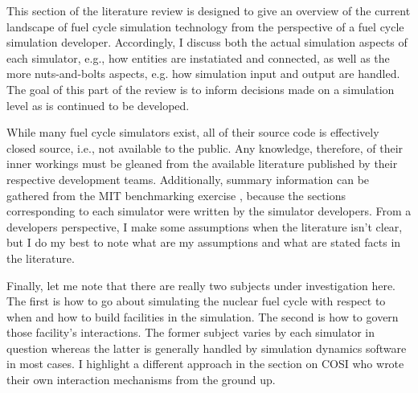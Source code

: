 This section of the literature review is designed to give an overview of the
current landscape of fuel cycle simulation technology from the perspective of a
fuel cycle simulation developer. Accordingly, I discuss both the actual
simulation aspects of each simulator, e.g., how entities are instatiated and
connected, as well as the more nuts-and-bolts aspects, e.g. how simulation input
and output are handled. The goal of this part of the review is to inform
decisions made on a simulation level as \Cyclus is continued to be developed.

While many fuel cycle simulators exist, all of their source code is effectively
closed source, i.e., not available to the public. Any knowledge, therefore, of
their inner workings must be gleaned from the available literature published by
their respective development teams. Additionally, summary information can be
gathered from the MIT benchmarking exercise \cite{guerin_benchmark_2009},
because the sections corresponding to each simulator were written by the
simulator developers. From a developers perspective, I make some assumptions
when the literature isn't clear, but I do my best to note what are my
assumptions and what are stated facts in the literature.

Finally, let me note that there are really two subjects under investigation
here. The first is how to go about simulating the nuclear fuel cycle with
respect to when and how to build facilities in the simulation. The second is how
to govern those facility's interactions. The former subject varies by each
simulator in question whereas the latter is generally handled by simulation
dynamics software in most cases. I highlight a different approach in the section
on COSI who wrote their own interaction mechanisms from the ground up.
